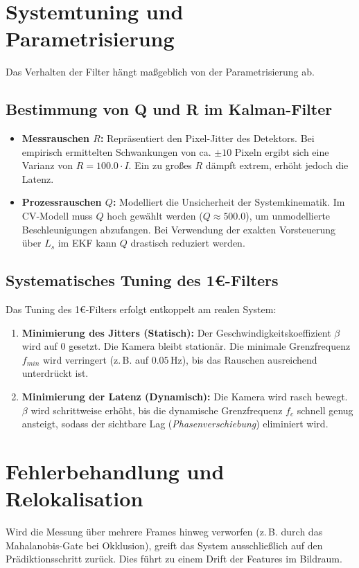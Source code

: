 \section{Systemtuning und Parametrisierung}
\label{sec:Systemtuning}
Das Verhalten der Filter hängt maßgeblich von der Parametrisierung ab.

\subsection{Bestimmung von Q und R im Kalman-Filter}
\begin{itemize}
    \item \textbf{Messrauschen $R$:} Repräsentiert den Pixel-Jitter des Detektors. Bei empirisch ermittelten Schwankungen von ca. $\pm 10$ Pixeln ergibt sich eine Varianz von $R = 100.0 \cdot I$. Ein zu großes $R$ dämpft extrem, erhöht jedoch die Latenz.
    \item \textbf{Prozessrauschen $Q$:} Modelliert die Unsicherheit der Systemkinematik. Im \ac{CV}-Modell muss $Q$ hoch gewählt werden ($Q \approx 500.0$), um unmodellierte Beschleunigungen abzufangen. Bei Verwendung der exakten Vorsteuerung über $L_s$ im \ac{EKF} kann $Q$ drastisch reduziert werden.
\end{itemize}

\subsection{Systematisches Tuning des 1\euro{}-Filters}
Das Tuning des 1\euro{}-Filters erfolgt entkoppelt am realen System:
\begin{enumerate}
    \item \textbf{Minimierung des Jitters (Statisch):} Der Geschwindigkeitskoeffizient $\beta$ wird auf $0$ gesetzt. Die Kamera bleibt stationär. Die minimale Grenzfrequenz $f_{min}$ wird verringert (z.\,B. auf $0.05\,\text{Hz}$), bis das Rauschen ausreichend unterdrückt ist.
    \item \textbf{Minimierung der Latenz (Dynamisch):} Die Kamera wird rasch bewegt. $\beta$ wird schrittweise erhöht, bis die dynamische Grenzfrequenz $f_c$ schnell genug ansteigt, sodass der sichtbare Lag (\textit{Phasenverschiebung}) eliminiert wird.
\end{enumerate}

\section{Fehlerbehandlung und Relokalisation}
\label{sec:Fehlerbehandlung}
Wird die Messung über mehrere Frames hinweg verworfen (z.\,B. durch das Mahalanobis-Gate bei Okklusion), greift das System ausschließlich auf den Prädiktionsschritt zurück. Dies führt zu einem Drift der Features im Bildraum.

